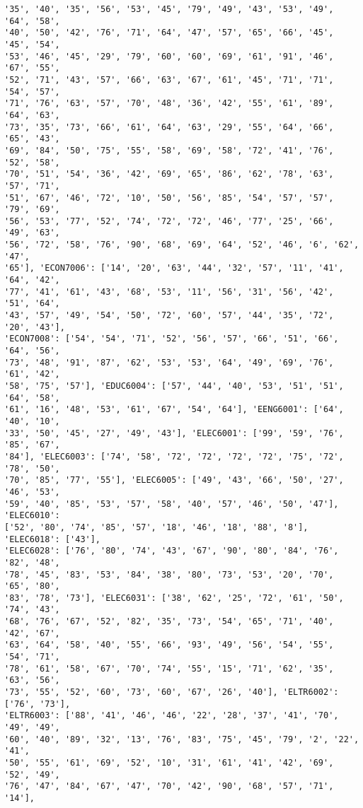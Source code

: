 \documentclass[11pt]{article}
\begin{document}
\begin{Verbatim}[commandchars=\\\{\}]
'35', '40', '35', '56', '53', '45', '79', '49', '43', '53', '49', '64', '58',
'40', '50', '42', '76', '71', '64', '47', '57', '65', '66', '45', '45', '54',
'53', '46', '45', '29', '79', '60', '60', '69', '61', '91', '46', '67', '55',
'52', '71', '43', '57', '66', '63', '67', '61', '45', '71', '71', '54', '57',
'71', '76', '63', '57', '70', '48', '36', '42', '55', '61', '89', '64', '63',
'73', '35', '73', '66', '61', '64', '63', '29', '55', '64', '66', '65', '43',
'69', '84', '50', '75', '55', '58', '69', '58', '72', '41', '76', '52', '58',
'70', '51', '54', '36', '42', '69', '65', '86', '62', '78', '63', '57', '71',
'51', '67', '46', '72', '10', '50', '56', '85', '54', '57', '57', '79', '69',
'56', '53', '77', '52', '74', '72', '72', '46', '77', '25', '66', '49', '63',
'56', '72', '58', '76', '90', '68', '69', '64', '52', '46', '6', '62', '47',
'65'], 'ECON7006': ['14', '20', '63', '44', '32', '57', '11', '41', '64', '42',
'77', '41', '61', '43', '68', '53', '11', '56', '31', '56', '42', '51', '64',
'43', '57', '49', '54', '50', '72', '60', '57', '44', '35', '72', '20', '43'],
'ECON7008': ['54', '54', '71', '52', '56', '57', '66', '51', '66', '64', '56',
'73', '48', '91', '87', '62', '53', '53', '64', '49', '69', '76', '61', '42',
'58', '75', '57'], 'EDUC6004': ['57', '44', '40', '53', '51', '51', '64', '58',
'61', '16', '48', '53', '61', '67', '54', '64'], 'EENG6001': ['64', '40', '10',
'33', '50', '45', '27', '49', '43'], 'ELEC6001': ['99', '59', '76', '85', '67',
'84'], 'ELEC6003': ['74', '58', '72', '72', '72', '72', '75', '72', '78', '50',
'70', '85', '77', '55'], 'ELEC6005': ['49', '43', '66', '50', '27', '46', '53',
'59', '40', '85', '53', '57', '58', '40', '57', '46', '50', '47'], 'ELEC6010':
['52', '80', '74', '85', '57', '18', '46', '18', '88', '8'], 'ELEC6018': ['43'],
'ELEC6028': ['76', '80', '74', '43', '67', '90', '80', '84', '76', '82', '48',
'78', '45', '83', '53', '84', '38', '80', '73', '53', '20', '70', '65', '80',
'83', '78', '73'], 'ELEC6031': ['38', '62', '25', '72', '61', '50', '74', '43',
'68', '76', '67', '52', '82', '35', '73', '54', '65', '71', '40', '42', '67',
'63', '64', '58', '40', '55', '66', '93', '49', '56', '54', '55', '54', '71',
'78', '61', '58', '67', '70', '74', '55', '15', '71', '62', '35', '63', '56',
'73', '55', '52', '60', '73', '60', '67', '26', '40'], 'ELTR6002': ['76', '73'],
'ELTR6003': ['88', '41', '46', '46', '22', '28', '37', '41', '70', '49', '49',
'60', '40', '89', '32', '13', '76', '83', '75', '45', '79', '2', '22', '41',
'50', '55', '61', '69', '52', '10', '31', '61', '41', '42', '69', '52', '49',
'76', '47', '84', '67', '47', '70', '42', '90', '68', '57', '71', '14'],

\end{Verbatim}
\end{document}
